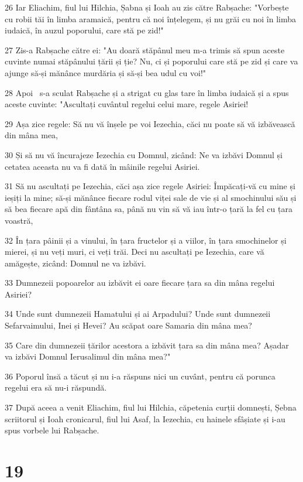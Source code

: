 \par 26 Iar Eliachim, fiul lui Hilchia, Șabna și Ioah au zis către Rabșache: "Vorbește cu robii tăi în limba aramaică, pentru că noi înțelegem, și nu grăi cu noi în limba iudaică, în auzul poporului, care stă pe zid!"
\par 27 Zis-a Rabșache către ei: "Au doară stăpânul meu m-a trimis să spun aceste cuvinte numai stăpânului țării și ție? Nu, ci și poporului care stă pe zid și care va ajunge să-și mănânce murdăria și să-și bea udul cu voi!"
\par 28 Apoi  s-a sculat Rabșache și a strigat cu glas tare în limba iudaică și a spus aceste cuvinte: "Ascultați cuvântul regelui celui mare, regele Asiriei!
\par 29 Așa zice regele: Să nu vă înșele pe voi Iezechia, căci nu poate să vă izbăvească din mâna mea,
\par 30 Și să nu vă încurajeze Iezechia cu Domnul, zicând: Ne va izbăvi Domnul și cetatea aceasta nu va fi dată în mâinile regelui Asiriei.
\par 31 Să nu ascultați pe Iezechia, căci așa zice regele Asiriei: Împăcați-vă cu mine și ieșiți la mine; să-și mănânce fiecare rodul viței sale de vie și al smochinului său și să bea fiecare apă din fântâna sa, până nu vin să vă iau într-o țară la fel cu țara voastră,
\par 32 În țara pâinii și a vinului, în țara fructelor și a viilor, în țara smochinelor și mierei, și nu veți muri, ci veți trăi. Deci nu ascultați pe Iezechia, care vă amăgește, zicând: Domnul ne va izbăvi.
\par 33 Dumnezeii popoarelor au izbăvit ei oare fiecare țara sa din mâna regelui Asiriei?
\par 34 Unde sunt dumnezeii Hamatului și ai Arpadului? Unde sunt dumnezeii Sefarvaimului, Inei și Hevei? Au scăpat oare Samaria din mâna mea?
\par 35 Care din dumnezeii țărilor acestora a izbăvit țara sa din mâna mea? Așadar va izbăvi Domnul Ierusalimul din mâna mea?"
\par 36 Poporul însă a tăcut și nu i-a răspuns nici un cuvânt, pentru că porunca regelui era să nu-i răspundă.
\par 37 După aceea a venit Eliachim, fiul lui Hilchia, căpetenia curții domnești, Șebna scriitorul și Ioah cronicarul, fiul lui Asaf, la Iezechia, cu hainele sfâșiate și i-au spus vorbele lui Rabșache.

\chapter{19}

